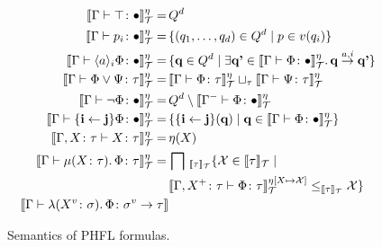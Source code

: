 \begin{figure}
    \caption{Semantics of PHFL formulas.}
    \label{figure:phfl-semantics}
    \begin{align*}
        \llbracket \Gamma \vdash \top \colon \bullet \rrbracket^\eta_\mathcal{T} =\,& Q^d\\
        \llbracket \Gamma \vdash p_i \colon \bullet \rrbracket^\eta_\mathcal{T} =\,& \{(q_1, \dots, q_d) \in Q^d \mid p \in v
        (q_i)\}\\
        \llbracket \Gamma \vdash \langle a \rangle_i \Phi \colon \bullet \rrbracket^\eta_\mathcal{T} =\,& \{\emph{q} \in Q^d \mid
        \exists \emph{q'} \in \llbracket \Gamma \vdash \Phi \colon \bullet \rrbracket^\eta_\mathcal{T}.\,\emph{q}
        \overset{a, i}{\rightarrow} \emph{q'}\}\\
        \llbracket \Gamma \vdash \Phi \vee \Psi \colon \tau \rrbracket^\eta_\mathcal{T} =\,& \llbracket \Gamma \vdash \Phi
        \colon \tau \rrbracket ^\eta_\mathcal{T} \sqcup_\tau \llbracket \Gamma \vdash \Psi \colon \tau \rrbracket ^\eta_\mathcal{T}\\
        \llbracket \Gamma \vdash \neg \Phi \colon \bullet \rrbracket^\eta_\mathcal{T} =\,& Q^d \setminus \llbracket
        \Gamma^- \vdash \Phi
        \colon \bullet \rrbracket ^\eta_\mathcal{T}\\
        \llbracket \Gamma \vdash \{\emph{i} \leftarrow \emph{j}\} \Phi \colon \bullet \rrbracket^\eta_\mathcal{T} =\,&
        \{\{\emph{i} \leftarrow \emph{j}\}(\emph{q}) \mid \emph{q} \in \llbracket \Gamma \vdash \Phi \colon \bullet
        \rrbracket ^\eta_\mathcal{T}\}\\
        \llbracket \Gamma, X \colon \tau \vdash X \colon \tau \rrbracket^\eta_\mathcal{T} =\,& \eta(X)\\
        \llbracket \Gamma \vdash \mu (X \colon \tau).\,\Phi \colon \tau \rrbracket^\eta_\mathcal{T} =\,&
        \bigsqcap\,_{\llbracket\tau\rrbracket_\mathcal{T}} \{\mathcal{X} \in \llbracket \tau \rrbracket_\mathcal{T}
        \mid \\
        &\llbracket \Gamma, X^+ \colon \tau \vdash \Phi \colon \tau \rrbracket^{\eta[X \mapsto \mathcal{X}]}_\mathcal{T}
        \leq_{\llbracket \tau \rrbracket_\mathcal{T}} \mathcal{X}\}\\
        \llbracket \Gamma \vdash \lambda (X^v \colon \sigma).\,\Phi \colon \sigma^v \rightarrow \tau \rrbracket

\end{align*}
\end{figure}

